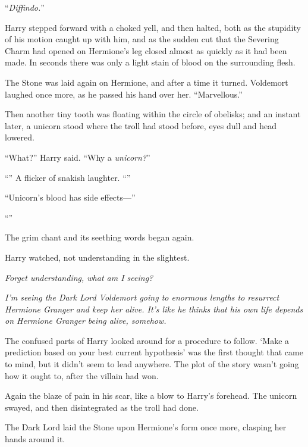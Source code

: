“\emph{Diffindo.}”

Harry stepped forward with a choked yell, and then halted, both as the stupidity of his motion caught up with him, and as the sudden cut that the Severing Charm had opened on Hermione’s leg closed almost as quickly as it had been made. In seconds there was only a light stain of blood on the surrounding flesh.

The Stone was laid again on Hermione, and after a time it turned. Voldemort laughed once more, as he passed his hand over her. “Marvellous.”

Then another tiny tooth was floating within the circle of obelisks; and an instant later, a unicorn stood where the troll had stood before, eyes dull and head lowered.

“What?” Harry said. “Why a \emph{unicorn?}”

“” A flicker of snakish laughter. “”

“Unicorn’s blood has side effects—”

“”

The grim chant and its seething words began again.

Harry watched, not understanding in the slightest.

\emph{Forget understanding, what am I seeing?}

\emph{I’m seeing the Dark Lord Voldemort going to enormous lengths to resurrect Hermione Granger and keep her alive. It’s like he thinks that his own life depends on Hermione Granger being alive, somehow.}

The confused parts of Harry looked around for a procedure to follow. ‘Make a prediction based on your best current hypothesis’ was the first thought that came to mind, but it didn’t seem to lead anywhere. The plot of the story wasn’t going how it ought to, after the villain had won.

Again the blaze of pain in his scar, like a blow to Harry’s forehead. The unicorn swayed, and then disintegrated as the troll had done.

The Dark Lord laid the Stone upon Hermione’s form once more, clasping her hands around it.

